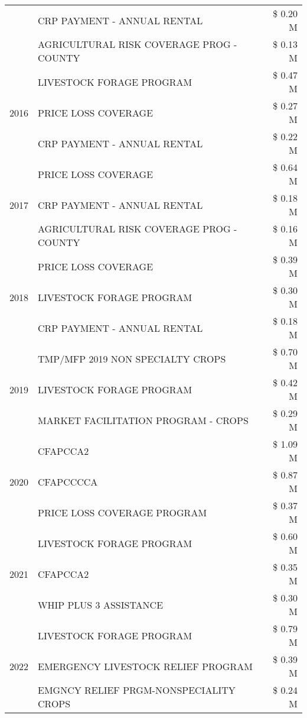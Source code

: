 \begin{tabular}{llr}
 & CRP PAYMENT - ANNUAL RENTAL & \$ 0.20 M \\
 & AGRICULTURAL RISK COVERAGE PROG - COUNTY & \$ 0.13 M \\
\cline{1-3}
\multirow[t]{3}{*}{2016} & LIVESTOCK FORAGE PROGRAM & \$ 0.47 M \\
 & PRICE LOSS COVERAGE & \$ 0.27 M \\
 & CRP PAYMENT - ANNUAL RENTAL & \$ 0.22 M \\
\cline{1-3}
\multirow[t]{3}{*}{2017} & PRICE LOSS COVERAGE & \$ 0.64 M \\
 & CRP PAYMENT - ANNUAL RENTAL & \$ 0.18 M \\
 & AGRICULTURAL RISK COVERAGE PROG - COUNTY & \$ 0.16 M \\
\cline{1-3}
\multirow[t]{3}{*}{2018} & PRICE LOSS COVERAGE & \$ 0.39 M \\
 & LIVESTOCK FORAGE PROGRAM & \$ 0.30 M \\
 & CRP PAYMENT - ANNUAL RENTAL & \$ 0.18 M \\
\cline{1-3}
\multirow[t]{3}{*}{2019} & TMP/MFP 2019 NON SPECIALTY CROPS & \$ 0.70 M \\
 & LIVESTOCK FORAGE PROGRAM & \$ 0.42 M \\
 & MARKET FACILITATION PROGRAM - CROPS & \$ 0.29 M \\
\cline{1-3}
\multirow[t]{3}{*}{2020} & CFAPCCA2 & \$ 1.09 M \\
 & CFAPCCCCA & \$ 0.87 M \\
 & PRICE LOSS COVERAGE PROGRAM & \$ 0.37 M \\
\cline{1-3}
\multirow[t]{3}{*}{2021} & LIVESTOCK FORAGE PROGRAM & \$ 0.60 M \\
 & CFAPCCA2 & \$ 0.35 M \\
 & WHIP PLUS 3 ASSISTANCE & \$ 0.30 M \\
\cline{1-3}
\multirow[t]{3}{*}{2022} & LIVESTOCK FORAGE PROGRAM & \$ 0.79 M \\
 & EMERGENCY LIVESTOCK RELIEF PROGRAM & \$ 0.39 M \\
 & EMGNCY RELIEF PRGM-NONSPECIALITY CROPS & \$ 0.24 M \\
\cline{1-3}
\bottomrule
\end{tabular}
